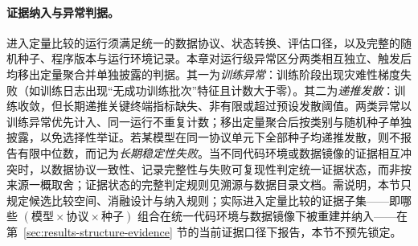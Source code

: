 \paragraph{证据纳入与异常判据。}进入定量比较的运行须满足统一的数据协议、状态转换、评估口径，以及完整的随机种子、程序版本与运行环境记录。本章对运行级异常区分两类相互独立、触发后均移出定量聚合并单独披露的判据。其一为\emph{训练异常}：训练阶段出现灾难性梯度失败（如训练日志出现“无成功训练批次”特征且计数大于零）。其二为\emph{递推发散}：训练收敛，但长期递推关键终端指标缺失、非有限或超过预设发散阈值。两类异常以训练异常优先计入、同一运行不重复计数；移出定量聚合后按类别与随机种子单独披露，以免选择性举证。若某模型在同一协议单元下全部种子均递推发散，则不报告有限中位数，而记为\emph{长期稳定性失败}。当不同代码环境或数据镜像的证据相互冲突时，以数据协议一致性、记录完整性与失败可复现性判定统一证据状态，而非按来源一概取舍；证据状态的完整判定规则见溯源与数据目录文档。需说明，本节只规定候选比较空间、消融设计与纳入规则；实际进入定量比较的证据子集——即哪些 \((\text{模型}\times\text{协议}\times\text{种子})\) 组合在统一代码环境与数据镜像下被重建并纳入——在第~\ref{sec:results-structure-evidence} 节的当前证据口径下报告，本节不预先锁定。
